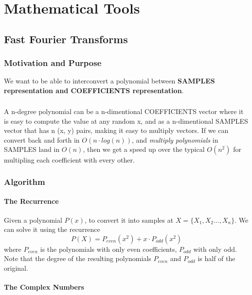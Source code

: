 \chapter{Mathematical Tools}



\section{Fast Fourier Transforms}


\subsection{Motivation and Purpose}

We want to be able to interconvert a polynomial between \textbf{SAMPLES representation and COEFFICIENTS representation}.

\paragraph{} A n-degree polynomial can be a n-dimentional COEFFICIENTS vector where it is easy to compute the value at any random x, and as a n-dimentional SAMPLES vector that has n (x, y) pairs, making it easy to multiply vectors. If we can convert back and forth in $O(n \cdot log(n))$, and \textit{multiply polynomials} in SAMPLES land in $O(n)$, then we get a speed up over the typical $O(n^2)$ for multipling each coefficient with every other.


\subsection{Algorithm}

\subsubsection{The Recurrence}

Given a polynomial $P(x)$, to convert it into samples at $X = \{X_1, X_2 ..., X_n\}$.
We can solve it using the recurrence
\begin{equation}
  P(X) = P_{even}(x^2) + x \cdot P_{odd}(x^2)
\end{equation}
where $P_{even}$ is the polynomials with only even coefficients, $P_{odd}$ with only odd.
Note that the degree of the resulting polynomials $P_{even}$ and $P_{odd}$ is half of the original.

\subsubsection{The Complex Numbers}

